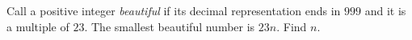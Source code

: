 Call a positive integer \emph{beautiful} if its decimal representation ends in $999$ and it is a multiple of $23$. The smallest beautiful number is $23n$. Find $n$.
